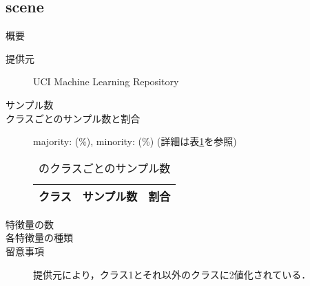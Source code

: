 \subsection{scene}
\begin{description}
    \item[概要] \cite{}
    \item[提供元] UCI Machine Learning Repository
    \item[サンプル数] 
    \item[クラスごとのサンプル数と割合] majority:  (\%), minority:  (\%) (詳細は表\ref{tab:}を参照)

        \begin{table}[htbp]
            \centering
            \caption{のクラスごとのサンプル数}
            \label{tab:}
            \begin{tabular}{lrc} \hline
                \multicolumn{1}{c}{クラス}&
                \multicolumn{1}{c}{サンプル数}&
                \multicolumn{1}{c}{割合}\\
                \hline
                \hline

                \hline
            \end{tabular}
        \end{table}

    \item[特徴量の数] 
    \item[各特徴量の種類] \mbox{}
        
    \item[留意事項] 提供元により，クラス1とそれ以外のクラスに2値化されている．
\end{description}


